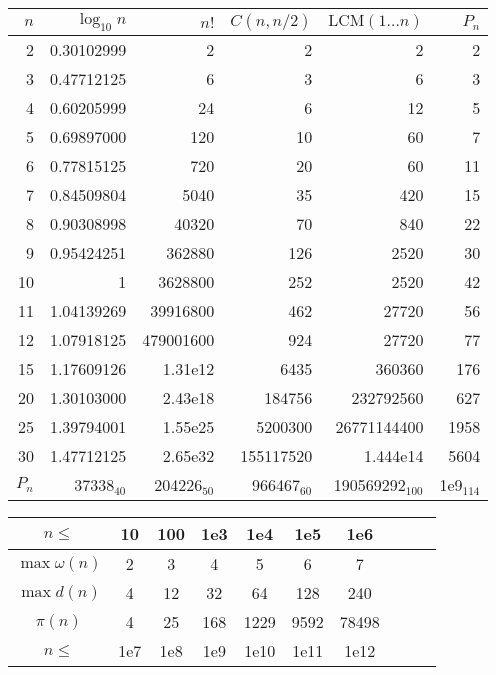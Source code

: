 \begin{table}[H]
	\centering
	\small
	\renewcommand\arraystretch{0.8}
	\begin{tabular}{|r|r|r|r|r|r|}
		\hline
		\rowcolor{black!10} $n$ & $\log_{10} n$ & $n!$ & $C(n,n/2)$ & $\mathrm{LCM}(1\dots n)$ & $P_n$\\
		\hline
		2 & 0.30102999 & 2 & 2 & 2 & 2\\
		\hline
		3 & 0.47712125 & 6 & 3 & 6 & 3\\
		\hline
		4 & 0.60205999 & 24 & 6 & 12 & 5\\
		\hline
		5 & 0.69897000 & 120 & 10 & 60 & 7\\
		\hline
		6 & 0.77815125 & 720 & 20 & 60 & 11\\
		\hline
		7 & 0.84509804 & 5040 & 35 & 420 & 15\\
		\hline
		8 & 0.90308998 & 40320 & 70 & 840 & 22\\
		\hline
		9 & 0.95424251 & 362880 & 126 & 2520 & 30\\
		\hline
		10 & 1 & 3628800 & 252  & 2520 & 42\\
		\hline
		11 & 1.04139269 & 39916800 & 462  & 27720 & 56\\
		\hline
		12 & 1.07918125 & 479001600 & 924 & 27720 & 77\\
		\hline
		15 & 1.17609126 & 1.31e{12} & 6435 & 360360 & 176\\
		\hline
		20 & 1.30103000 & 2.43e{18} & 184756 & 232792560 & 627\\
		\hline
		25 & 1.39794001 & 1.55e{25} & 5200300 & 26771144400 & 1958\\
		\hline
		30 & 1.47712125 & 2.65e{32} & 155117520 & 1.444e{14} & 5604\\
		\hline
		$P_n$ & 37338$_{40}$ & 204226$_{50}$ & 966467$_{60}$ & 190569292$_{100}$ & 1e{9}$_{114}$\\
		\hline
	\end{tabular}
		\begin{tabular}{|c|c|c|c|c|c|c|c|c|c|}
			\hline
			\rowcolor{black!10} $n \leq$ & 10 &  100 & 1e3 & 1e4 & 1e5 & 1e6 \\
			\hline
			$\max\omega(n)$ & 2 & 3 & 4 & 5 & 6 & 7  \\
			\hline
			$\max{d(n)}$ & 4 & 12 & 32 & 64 & 128 & 240 \\
			\hline
			$\pi(n)$ & 4 & 25 & 168 & 1229 & 9592 & 78498 \\
			\hline
			\rowcolor{black!10} $n \leq$ & 1e7 & 1e8 & 1e9 & 1e10 & 1e11& 1e12\\
			\hline

\end{tabular}
\end{table}
